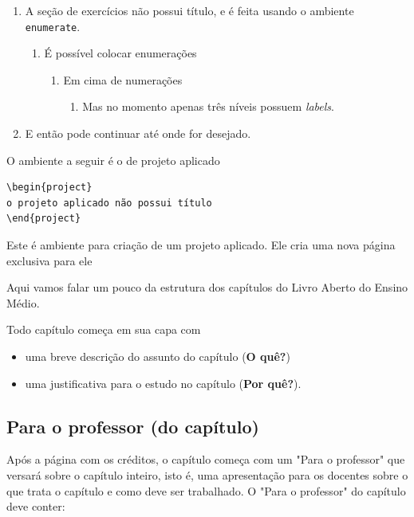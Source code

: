 \exercise

\begin{enumerate}
\item A seção de exercícios não possui título, e é feita usando o ambiente \verb|enumerate|.
\begin{enumerate}
\item É possível colocar enumerações
\begin{enumerate}
\item Em cima de numerações
\begin{enumerate}
\item Mas no momento apenas três níveis possuem \textit{labels}.
\end{enumerate}
\end{enumerate}
\end{enumerate}

\item E então pode continuar até onde for desejado.
\end{enumerate}

O ambiente a seguir é o de projeto aplicado
\begin{verbatim}
\begin{project}
o projeto aplicado não possui título
\end{project}
\end{verbatim}

\begin{project}
Este é ambiente para criação de um projeto aplicado. Ele cria uma nova página exclusiva para ele

\end{project}


Aqui vamos falar um pouco da estrutura dos capítulos do Livro Aberto do Ensino Médio.

Todo capítulo começa em sua capa com 

\begin{itemize}
\item uma breve descrição do assunto do capítulo (\textbf{O quê?})
\item uma justificativa para o estudo no capítulo (\textbf{Por quê?}).
\end{itemize} 

\subsection{Para o professor (do capítulo)}
Após a página com os créditos, o capítulo começa com um "Para o professor" que versará sobre o capítulo inteiro, isto é, uma apresentação para os docentes sobre o que trata o capítulo e como deve ser trabalhado. O "Para o professor" do capítulo deve conter:

